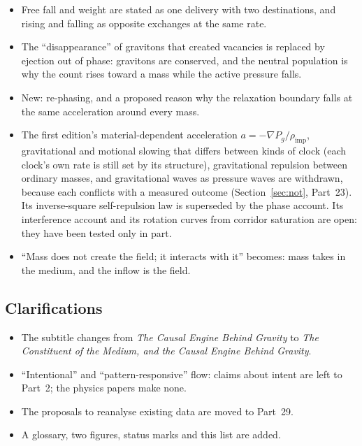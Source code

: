 \documentclass[11pt,a4paper]{article}
\begin{document}
\begin{itemize}
\item Free fall and weight are stated as one delivery with two destinations, and rising and falling as opposite exchanges at the same rate.
\item The ``disappearance'' of gravitons that created vacancies is replaced by ejection out of phase: gravitons are conserved, and the neutral population is why the count rises toward a mass while the active pressure falls.
\item New: re-phasing, and a proposed reason why the relaxation boundary falls at the same acceleration around every mass.
\item The first edition's material-dependent acceleration $a = -\nabla P_g/\rho_{\text{imp}}$, gravitational and motional slowing that differs between kinds of clock (each clock's own rate is still set by its structure), gravitational repulsion between ordinary masses, and gravitational waves as pressure waves are withdrawn, because each conflicts with a measured outcome (Section~\ref{sec:not}, Part~23). Its inverse-square self-repulsion law is superseded by the phase account. Its interference account and its rotation curves from corridor saturation are open: they have been tested only in part.
\item ``Mass does not create the field; it interacts with it'' becomes: mass takes in the medium, and the inflow is the field.
\end{itemize}

\subsection*{Clarifications}
\begin{itemize}
\item The subtitle changes from \emph{The Causal Engine Behind Gravity} to \emph{The Constituent of the Medium, and the Causal Engine Behind Gravity}.
\item ``Intentional'' and ``pattern-responsive'' flow: claims about intent are left to Part~2; the physics papers make none.
\item The proposals to reanalyse existing data are moved to Part~29.
\item A glossary, two figures, status marks and this list are added.
\end{itemize}

\newpage


\end{document}
